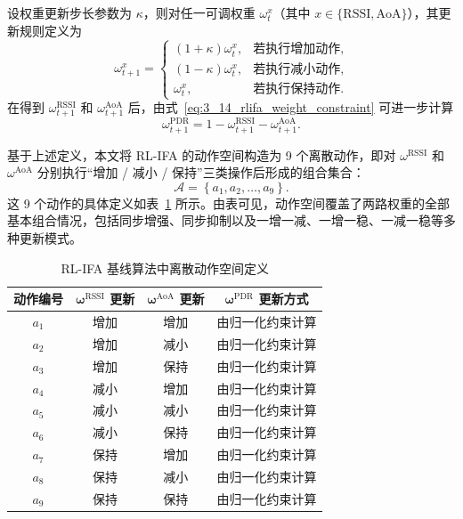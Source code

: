 设权重更新步长参数为 \(\kappa\)，则对任一可调权重 \(\omega_t^{x}\)（其中 \(x \in \{\mathrm{RSSI},\mathrm{AoA}\}\)），其更新规则定义为
\begin{equation}
\omega_{t+1}^{x}=
\begin{cases}
(1+\kappa)\omega_t^{x}, & \text{若执行增加动作},\\[4pt]
(1-\kappa)\omega_t^{x}, & \text{若执行减小动作},\\[4pt]
\omega_t^{x}, & \text{若执行保持动作}.
\end{cases}
\label{eq:3_15_rlifa_weight_update}
\end{equation}
在得到 \(\omega_{t+1}^{\mathrm{RSSI}}\) 和 \(\omega_{t+1}^{\mathrm{AoA}}\) 后，由式~\eqref{eq:3_14_rlifa_weight_constraint} 可进一步计算
\begin{equation}
\omega_{t+1}^{\mathrm{PDR}}
=
1-\omega_{t+1}^{\mathrm{RSSI}}-\omega_{t+1}^{\mathrm{AoA}}.
\label{eq:3_16_rlifa_pdr_weight}
\end{equation}

基于上述定义，本文将 RL-IFA 的动作空间构造为 9 个离散动作，即对 \(\omega^{\mathrm{RSSI}}\) 和 \(\omega^{\mathrm{AoA}}\) 分别执行“增加 / 减小 / 保持”三类操作后形成的组合集合：
\begin{equation}
\mathcal{A}
=
\left\{
a_1,a_2,\ldots,a_9
\right\}.
\label{eq:3_17_rlifa_action_set}
\end{equation}
这 9 个动作的具体定义如表~\ref{tab:rlifa_action_space} 所示。由表可见，动作空间覆盖了两路权重的全部基本组合情况，包括同步增强、同步抑制以及一增一减、一增一稳、一减一稳等多种更新模式。

\begin{table}[htbp]
    \centering
    \caption{RL-IFA 基线算法中离散动作空间定义}
    \label{tab:rlifa_action_space}
    \begin{tabular}{cccc}
        \toprule
        \textbf{动作编号} & \(\boldsymbol{\omega^{\mathrm{RSSI}}}\) \textbf{更新} & \(\boldsymbol{\omega^{\mathrm{AoA}}}\) \textbf{更新} & \(\boldsymbol{\omega^{\mathrm{PDR}}}\) \textbf{更新方式} \\
        \midrule
        \(a_1\) & 增加 & 增加 & 由归一化约束计算 \\
        \(a_2\) & 增加 & 减小 & 由归一化约束计算 \\
        \(a_3\) & 增加 & 保持 & 由归一化约束计算 \\
        \(a_4\) & 减小 & 增加 & 由归一化约束计算 \\
        \(a_5\) & 减小 & 减小 & 由归一化约束计算 \\
        \(a_6\) & 减小 & 保持 & 由归一化约束计算 \\
        \(a_7\) & 保持 & 增加 & 由归一化约束计算 \\
        \(a_8\) & 保持 & 减小 & 由归一化约束计算 \\
        \(a_9\) & 保持 & 保持 & 由归一化约束计算 \\
        \bottomrule
    \end{tabular}
\end{table}

